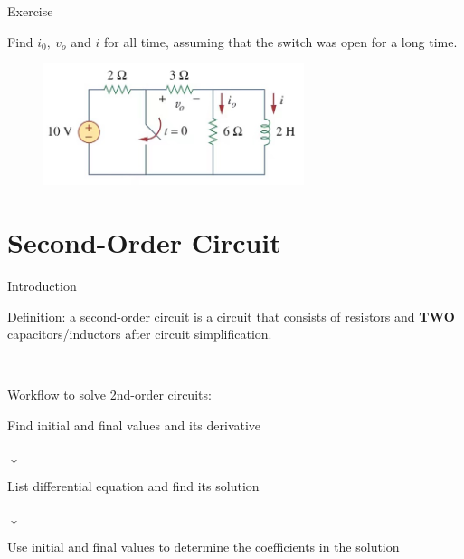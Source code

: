\documentclass{beamer}
\begin{document}

\begin{frame}{Exercise}

Find $i_0,\ v_o$ and $i$ for all time, assuming that the switch was open for a long time.
\begin{figure}
\centering
\includegraphics[width=3in]{img_1order/ex3.jpg}
\end{figure}
\end{frame}






\section{Second-Order Circuit}


\begin{frame}{Introduction}

Definition: a second-order circuit is a circuit that consists of resistors and \textbf{TWO} capacitors/inductors after circuit simplification.

\

Workflow to solve 2nd-order circuits:
\begin{center}
    Find initial and final values and its derivative
    
    $\downarrow$

    List differential equation and find its solution

    $\downarrow$

    Use initial and final values to determine the coefficients in the solution
    
\end{center}

\end{frame}
\end{document}
